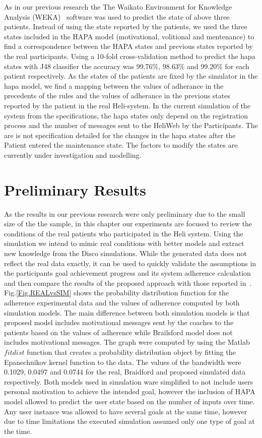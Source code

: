 \documentclass{llncs}
\begin{document}
As in our previous research the The Waikato Environment for Knowledge Analysis (WEKA)~\cite{WEKA} software was used to predict the state of above three patients. Instead of using the state reported by the patients, we used the three states included in the HAPA model (motivational, volitional and mentenance) to find a correspondence between the HAPA states and previous states reported by the real participants.  Using a 10-fold cross-validation method to predict the hapa states with J48 classifier the accuracy was  99.76\%, 98.63\% and 99.20\% for each patient respectively. As the states of the patients are fixed by the simulator in the hapa model, we find a mapping between the values of adherance in the precedents of the rules and the values of adherance in the previous states reported by the patient in the real Heli-system. In the current simulation of the system from the specifications, the hapa states only depend on the registration process and the number of messages sent to the HeliWeb by the Participants. The are is not specification detailed for the changes in the hapa states after the Patient entered the maintenance state. The factors to modify the states are currently under investigation and modelling.

\section {Preliminary Results}
\label{sec.results}

As the results in our previous research were only preliminary due to the small size of the the sample, in this chapter our experiments are focused to review the conditions of the real patients who participated in the Heli system. Using the simulation we intend to mimic real conditions with better models and extract new knowledge from the Disco simulations.  While the generated data does not reflect the real data exactly, it can be used to quickly validate the assumptions in the participants goal achievement progress and its system adherence calculation and then compare the results of the proposed approach with those reported in~\cite{Brailsford2016}. Fig.\ref{Fig.REALvsSIM} shows the probability distribution function for the adherence experimental data and the values of adherence computed by both simulation models. The main difference between both simulation models is that proposed model includes motivational messages sent by the coaches to the patients based on the values of adherence while Brailsford model does not includes motivational messages. The graph were computed by using the Matlab $fitdist$ function that creates a probability distribution object by fitting the Epanechnikov kernel function to the data. The values of the bandwidth were 0.1029, 0.0497 and 0.0744 for the real, Braidford and proposed simulated data respectively. Both models used in simulation ware simplified to not include users personal motivation to achieve the intended goal, however the inclusion of HAPA model allowed to predict the user state based on the number of inputs over time. Any user instance was allowed to have several goals at the same time, however due to time limitations the executed simulation assumed only one type of goal at the time. 
\end{document}
